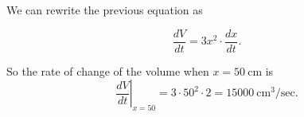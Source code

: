 \documentclass[cal1spr16Lectures.tex]{subfiles}
\begin{document}
\begin{frame}

We can rewrite the previous equation as

\[\frac{dV}{dt}=3x^2 \cdot \frac{dx}{dt}.\]

\vspace{1pc}
So the rate of change of the volume when $x=50\ \text{cm}$ is 
\[\left.\frac{dV}{dt}\right|_{x=50}=3\cdot 50^2 \cdot 2 = 15000\ \text{cm}^3/\text{sec}.\]
\end{frame}
\end{document}
